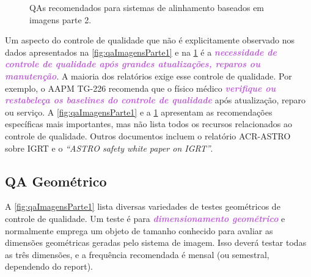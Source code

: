\documentclass[11pt,a4paper]{article}
\newcounter{exemplo}
\begin{document}
    \begin{figure}[!h]
        \centering
        \caption{QAs recomendados para sistemas de alinhamento baseados em imagens parte 2.}
        \label{fig:qaImagensParte2}
    \end{figure}

    Um aspecto do controle de qualidade que não é explicitamente observado nos dados apresentados na \ref{fig:qaImagensParte1} e na \ref{fig:qaImagensParte2} é a \textcolor{MediumOrchid}{\textbf{\textit{necessidade de controle de qualidade após grandes atualizações, reparos ou manutenção}}}. A maioria dos relatórios exige esse controle de qualidade. Por exemplo, o AAPM TG-226 recomenda que o físico médico \textcolor{MediumOrchid}{\textbf{\textit{verifique ou restabeleça os baselines do controle de qualidade}}} após atualização, reparo ou serviço. A \ref{fig:qaImagensParte1} e a \ref{fig:qaImagensParte2} apresentam as recomendações específicas mais importantes, mas não lista todos os recursos relacionados ao controle de qualidade. Outros documentos incluem o relatório ACR-ASTRO sobre IGRT e o \textit{``ASTRO safety white paper on IGRT''}.

\subsection*{QA Geométrico}

    A \ref{fig:qaImagensParte1} lista diversas variedades de testes geométricos de controle de qualidade. Um teste é para \textcolor{MediumOrchid}{\textbf{\textit{dimensionamento geométrico}}} e normalmente emprega um objeto de tamanho conhecido para avaliar as dimensões geométricas geradas pelo sistema de imagem. Isso deverá testar todas as três dimensões, e a frequência recomendada é mensal (ou semestral, dependendo do report). 
    
\end{document}
